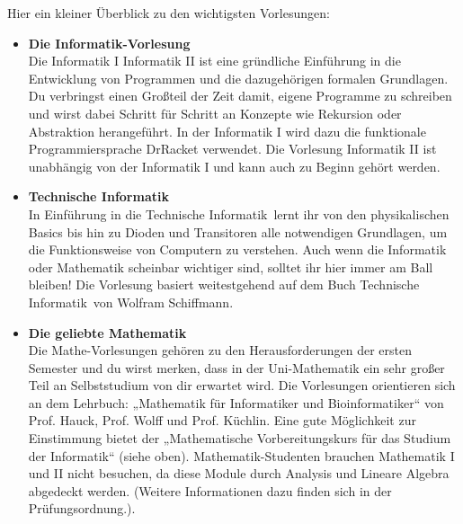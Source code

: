 \ifbachelor
{}
Hier ein kleiner Überblick zu den wichtigsten Vorlesungen:
\begin{itemize}
	\item 
	\textbf{Die Informatik-Vorlesung}\\
	Die 
	\ifwintersemester Informatik I \fi
	\ifsommersemester Informatik II \fi 
	ist eine gründliche Einführung in die Entwicklung von Programmen und die dazugehörigen formalen Grundlagen. 
	Du verbringst einen Großteil der Zeit damit, eigene Programme zu schreiben und wirst dabei Schritt für Schritt 
	an Konzepte wie Rekursion oder Abstraktion herangeführt. 
	\ifwintersemester In der Informatik I wird dazu die funktionale Programmiersprache DrRacket verwendet. \fi
	\ifsommersemester Die Vorlesung Informatik II ist unabhängig von der Informatik I und kann auch zu Beginn gehört werden. \fi
	
	\ifinfo
	\ifwintersemester
	\item 
	\textbf{Technische Informatik} \\
	In \glqq Einführung in die Technische Informatik\grqq \ lernt ihr von den physikalischen Basics bis hin zu Dioden und Transitoren alle notwendigen Grundlagen, um die Funktionsweise von Computern zu verstehen. Auch wenn die Informatik oder Mathematik scheinbar wichtiger sind, solltet ihr hier immer am Ball bleiben! Die Vorlesung basiert weitestgehend auf dem Buch \glqq Technische Informatik\grqq \ von Wolfram Schiffmann.
	\fi
	\fi
	
	\item 
	\textbf{Die geliebte Mathematik} \\
	Die Mathe-Vorlesungen gehören zu den Herausforderungen der ersten Semester und du wirst merken, dass in der Uni-Mathematik ein sehr großer Teil an Selbststudium von dir erwartet wird. Die Vorlesungen orientieren sich an dem Lehrbuch: „Mathematik für Informatiker und Bioinformatiker“ von Prof. Hauck, Prof. Wolff und Prof. Küchlin. Eine gute Möglichkeit zur Einstimmung bietet der „Mathematische Vorbereitungskurs für das Studium der Informatik“ (siehe oben). 
	\iflehramt
	Mathematik-Studenten brauchen Mathematik I
	und II nicht besuchen, da diese Module durch Analysis und Lineare Algebra
	abgedeckt werden. (Weitere Informationen dazu finden sich in der
	Prüfungsordnung.).
	\fi
\end{itemize}
\fi
